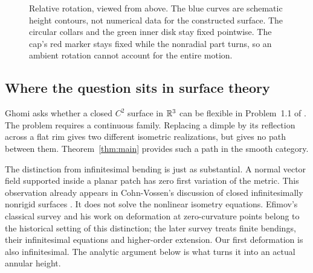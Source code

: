 \begin{figure}[htbp]
\centering
{}
\caption{Relative rotation, viewed from above. The blue curves are
schematic height contours, not numerical data for the constructed
surface. The circular collars and the green inner disk stay fixed
pointwise. The cap's red marker stays fixed while the nonradial part
turns, so an ambient rotation cannot account for the entire motion.}
\label{fig:surface-motion}
\end{figure}

\subsection{Where the question sits in surface theory}

Ghomi asks whether a closed $C^2$ surface in $\mathbb R^3$ can be flexible
in Problem~1.1 of \cite{Ghomi2019}. The problem requires a continuous
family. Replacing a dimple by its reflection across a flat rim gives
two different isometric realizations, but gives no path between them.
Theorem~\ref{thm:main} provides such a path in the smooth category.

The distinction from infinitesimal bending is just as substantial.
A normal vector field supported inside a planar patch has zero first
variation of the metric. This observation already appears in
Cohn-Vossen's discussion of closed infinitesimally nonrigid surfaces
\cite[footnote~2]{CohnVossen1930}. It does not solve the nonlinear
isometry equations. Efimov's classical survey
\cite{Efimov1948Survey} and his work on deformation at zero-curvature
points \cite{Efimov1948Zero} belong to the historical setting of this
distinction; the later survey \cite[Sections~1.1--1.4]{IvanovaSabitov1991}
treats finite bendings, their infinitesimal equations and higher-order
extension. Our first deformation is also infinitesimal. The analytic
argument below is what turns it into an actual annular height.

